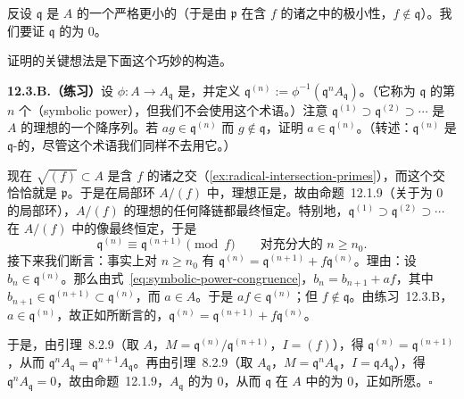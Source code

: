 反设 $\mathfrak{q}$ 是 $A$ 的一个严格更小的\trPrimeIdeal（于是由 $\mathfrak{p}$ 在含 $f$ 的诸\trPrimeIdeal{}之中的极小性，$f\notin\mathfrak{q}$）。我们要证 $\mathfrak{q}$ 的\trCodimension{}为 $0$。

证明的关键想法是下面这个巧妙的构造。

\textbf{12.3.B.（练习）}\quad 设 $\phi\colon A\to A_{\mathfrak{q}}$ 是\trLocalization，并定义 $\mathfrak{q}^{(n)}:=\phi^{-1}(\mathfrak{q}^nA_{\mathfrak{q}})$。（它称为 $\mathfrak{q}$ 的第 $n$ 个\textbf{\trSymbolicPower}（symbolic power），但我们不会使用这个术语。）注意 $\mathfrak{q}^{(1)}\supset\mathfrak{q}^{(2)}\supset\cdots$ 是 $A$ 的理想的一个降序列。若 $ag\in\mathfrak{q}^{(n)}$ 而 $g\notin\mathfrak{q}$，证明 $a\in\mathfrak{q}^{(n)}$。（转述：$\mathfrak{q}^{(n)}$ 是 $\mathfrak{q}$-\trPrimary{}的，尽管这个术语我们同样不去用它。）

现在 $\sqrt{(f)}\subset A$ 是含 $f$ 的诸\trMinimalPrimeIdeal{}之交（\cref{ex:radical-intersection-primes}），而这个交恰恰就是\trMaximalIdeal{} $\mathfrak{p}$。于是在局部环 $A/(f)$ 中，\trNilradical{}理想正是\trMaximalIdeal，故由命题~12.1.9（关于\trDimension{}为 $0$ 的\trNoetherian{}局部环），$A/(f)$ 的理想的任何降链都最终恒定。特别地，$\mathfrak{q}^{(1)}\supset\mathfrak{q}^{(2)}\supset\cdots$ 在 $A/(f)$ 中的像最终恒定，于是
\begin{equation*}\tag{12.3.4.1}\label{eq:symbolic-power-congruence}
\mathfrak{q}^{(n)}\equiv\mathfrak{q}^{(n+1)}\pmod{f}\qquad\text{对充分大的 }n\ge n_0.
\end{equation*}
接下来我们断言：事实上对 $n\ge n_0$ 有 $\mathfrak{q}^{(n)}=\mathfrak{q}^{(n+1)}+f\mathfrak{q}^{(n)}$。理由：设 $b_n\in\mathfrak{q}^{(n)}$。那么由式~\eqref{eq:symbolic-power-congruence}，$b_n=b_{n+1}+af$，其中 $b_{n+1}\in\mathfrak{q}^{(n+1)}\subset\mathfrak{q}^{(n)}$，而 $a\in A$。于是 $af\in\mathfrak{q}^{(n)}$；但 $f\notin\mathfrak{q}$。由\mbox{练习~12.3.B}，$a\in\mathfrak{q}^{(n)}$，故正如所断言的，$\mathfrak{q}^{(n)}=\mathfrak{q}^{(n+1)}+f\mathfrak{q}^{(n)}$。

于是，由\trNakayama{}引理~8.2.9（取 $A$，$M=\mathfrak{q}^{(n)}/\mathfrak{q}^{(n+1)}$，$I=(f)$），得 $\mathfrak{q}^{(n)}=\mathfrak{q}^{(n+1)}$，从而 $\mathfrak{q}^nA_{\mathfrak{q}}=\mathfrak{q}^{n+1}A_{\mathfrak{q}}$。再由\trNakayama{}引理~8.2.9（取 $A_{\mathfrak{q}}$，$M=\mathfrak{q}^nA_{\mathfrak{q}}$，$I=\mathfrak{q}A_{\mathfrak{q}}$），得 $\mathfrak{q}^nA_{\mathfrak{q}}=0$，故由命题~12.1.9，$A_{\mathfrak{q}}$ 的\trDimension{}为 $0$，从而 $\mathfrak{q}$ 在 $A$ 中的\trCodimension{}为 $0$，正如所愿。\hfill$\square$

